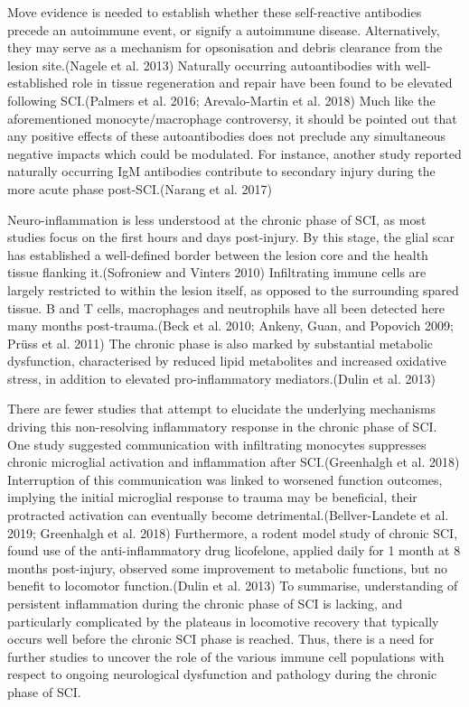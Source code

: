 \documentclass[9pt,lineno]{elife}
\begin{document}
\begin{landscape}
\begin{landscape}
Move evidence is needed to establish whether these self-reactive antibodies precede an autoimmune event, or signify a autoimmune disease.
Alternatively, they may serve as a mechanism for opsonisation and debris clearance from the lesion site.(Nagele et al. 2013) Naturally occurring autoantibodies with well-established role in tissue regeneration and repair have been found to be elevated following SCI.(Palmers et al. 2016; Arevalo-Martin et al. 2018) Much like the aforementioned monocyte/macrophage controversy, it should be pointed out that any positive effects of these autoantibodies does not preclude any simultaneous negative impacts which could be modulated.
For instance, another study reported naturally occurring IgM antibodies contribute to secondary injury during the more acute phase post-SCI.(Narang et al. 2017)

Neuro-inflammation is less understood at the chronic phase of SCI, as most studies focus on the first hours and days post-injury.
By this stage, the glial scar has established a well-defined border between the lesion core and the health tissue flanking it.(Sofroniew and Vinters 2010) Infiltrating immune cells are largely restricted to within the lesion itself, as opposed to the surrounding spared tissue. B and T cells, macrophages and neutrophils have all been detected here many months post-trauma.(Beck et al. 2010; Ankeny, Guan, and Popovich 2009; Prüss et al. 2011) The chronic phase is also marked by substantial metabolic dysfunction, characterised by reduced lipid metabolites and increased oxidative stress, in addition to elevated pro-inflammatory mediators.(Dulin et al. 2013)

There are fewer studies that attempt to elucidate the underlying mechanisms driving this non-resolving inflammatory response in the chronic phase of SCI.
One study suggested communication with infiltrating monocytes suppresses chronic microglial activation and inflammation after SCI.(Greenhalgh et al. 2018) Interruption of this communication was linked to worsened function outcomes, implying the initial microglial response to trauma may be beneficial, their protracted activation can eventually become detrimental.(Bellver-Landete et al. 2019; Greenhalgh et al. 2018) Furthermore, a rodent model study of chronic SCI, found use of the anti-inflammatory drug licofelone, applied daily for 1 month at 8 months post-injury, observed some improvement to metabolic functions, but no benefit to locomotor function.(Dulin et al. 2013) To summarise, understanding of persistent inflammation during the chronic phase of SCI is lacking, and particularly complicated by the plateaus in locomotive recovery that typically occurs well before the chronic SCI phase is reached.
Thus, there is a need for further studies to uncover the role of the various immune cell populations with respect to ongoing neurological dysfunction and pathology during the chronic phase of SCI.


\end{landscape}
\end{landscape}
\end{document}
